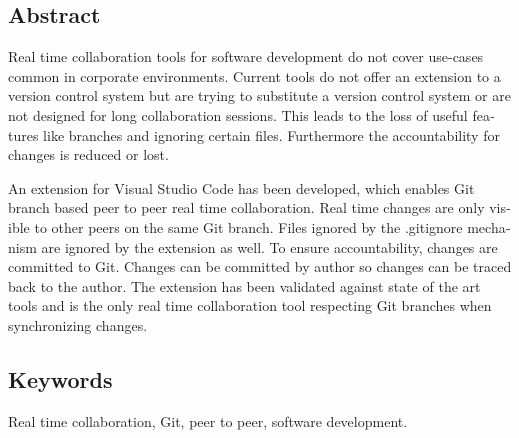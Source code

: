 
\begin{otherlanguage}{english}

  \chapter*{Abstract}

  Real time collaboration tools for software development do not cover use-cases common in corporate environments. Current tools do not offer an extension to a version control system but are trying to substitute a version control system or are not designed for long collaboration sessions. This leads to the loss of useful features like branches and ignoring certain files. Furthermore the accountability for changes is reduced or lost.

  An extension for Visual Studio Code has been developed, which enables Git branch based peer to peer real time collaboration. Real time changes are only visible to other peers on the same Git branch. Files ignored by the .gitignore mechanism are ignored by the extension as well. To ensure accountability, changes are committed to Git. Changes can be committed by author so changes can be traced back to the author. The extension has been validated against state of the art tools and is the only real time collaboration tool respecting Git branches when synchronizing changes.

  \bigskip

  \section*{Keywords}
  Real time collaboration, Git, peer to peer, software development.

\end{otherlanguage}
